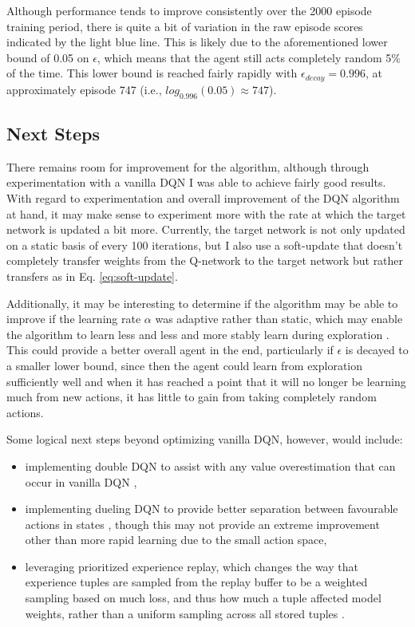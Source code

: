 \documentclass[11pt]{article}
\begin{document}
Although performance tends to improve consistently over the 2000 episode training period, there is quite a bit of variation in the raw episode scores indicated by the light blue line. This is likely due to the aforementioned lower bound of 0.05 on $\epsilon$, which means that the agent still acts completely random 5\% of the time. This lower bound is reached fairly rapidly with $\epsilon_{decay}=0.996$, at approximately episode 747 (i.e., $log_{0.996}(0.05) \approx 747$).

\subsection{Next Steps}

There remains room for improvement for the algorithm, although through experimentation with a vanilla DQN I was able to achieve fairly good results. With regard to experimentation and overall improvement of the DQN algorithm at hand, it may make sense to experiment more with the rate at which the target network is updated a bit more. Currently, the target network is not only updated on a static basis of every 100 iterations, but I also use a soft-update that doesn't completely transfer weights from the Q-network to the target network but rather transfers as in Eq. \ref{eq:soft-update}.

Additionally, it may be interesting to determine if the algorithm may be able to improve if the learning rate $\alpha$ was adaptive rather than static, which may enable the algorithm to learn less and less and more stably learn during exploration \cite{adaptive}. This could provide a better overall agent in the end, particularly if $\epsilon$ is decayed to a smaller lower bound, since then the agent could learn from exploration sufficiently well and when it has reached a point that it will no longer be learning much from new actions, it has little to gain from taking completely random actions.

Some logical next steps beyond optimizing vanilla DQN, however, would include:
\begin{itemize}
\item implementing double DQN to assist with any value overestimation that can occur in vanilla DQN \cite{ddqn},
\item implementing dueling DQN to provide better separation between favourable actions in states \cite{dueling}, though this may not provide an extreme improvement other than more rapid learning due to the small action space,
\item leveraging prioritized experience replay, which changes the way that experience tuples are sampled from the replay buffer to be a weighted sampling based on much loss, and thus how much a tuple affected model weights, rather than a uniform sampling across all stored tuples \cite{replay}.
\end{itemize}
\end{document}
